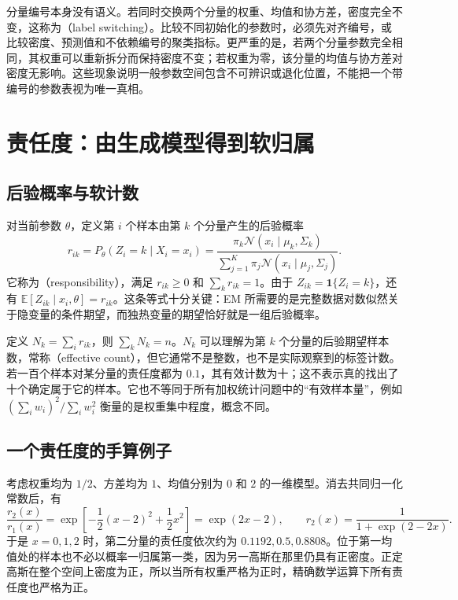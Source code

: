 \documentclass[UTF8]{ctexart}
\begin{document}
分量编号本身没有语义。若同时交换两个分量的权重、均值和协方差，密度完全不变，这称为（label switching）。比较不同初始化的参数时，必须先对齐编号，或比较密度、预测值和不依赖编号的聚类指标。更严重的是，若两个分量参数完全相同，其权重可以重新拆分而保持密度不变；若权重为零，该分量的均值与协方差对密度无影响。这些现象说明一般参数空间包含不可辨识或退化位置，不能把一个带编号的参数表视为唯一真相。

\section{责任度：由生成模型得到软归属}
\label{sec:gmm-responsibility}

\subsection{后验概率与软计数}
对当前参数 $\theta$，定义第 $i$ 个样本由第 $k$ 个分量产生的后验概率
\begin{equation}
r_{ik}=P_\theta(Z_i=k\mid X_i=x_i)
=\frac{\pi_k\mathcal N(x_i\mid\mu_k,\Sigma_k)}{\sum_{j=1}^K\pi_j\mathcal N(x_i\mid\mu_j,\Sigma_j)}.
\label{eq:gmm-responsibility}
\end{equation}
它称为（responsibility），满足 $r_{ik}\geq0$ 和 $\sum_kr_{ik}=1$。由于 $Z_{ik}=\mathbf1\{Z_i=k\}$，还有 $\mathbb E[Z_{ik}\mid x_i,\theta]=r_{ik}$。这条等式十分关键：EM 所需要的是完整数据对数似然关于隐变量的条件期望，而独热变量的期望恰好就是一组后验概率。

定义 $N_k=\sum_i r_{ik}$，则 $\sum_kN_k=n$。$N_k$ 可以理解为第 $k$ 个分量的后验期望样本数，常称（effective count），但它通常不是整数，也不是实际观察到的标签计数。若一百个样本对某分量的责任度都为 $0.1$，其有效计数为十；这不表示真的找出了十个确定属于它的样本。它也不等同于所有加权统计问题中的“有效样本量”，例如 $(\sum_iw_i)^2/\sum_iw_i^2$ 衡量的是权重集中程度，概念不同。

\subsection{一个责任度的手算例子}
考虑权重均为 $1/2$、方差均为 $1$、均值分别为 $0$ 和 $2$ 的一维模型。消去共同归一化常数后，有
\[
\frac{r_2(x)}{r_1(x)}
=\exp\!\left[-\frac12(x-2)^2+\frac12x^2\right]
=\exp(2x-2),
\qquad r_2(x)=\frac{1}{1+\exp(2-2x)}.
\]
于是 $x=0,1,2$ 时，第二分量的责任度依次约为 $0.1192,0.5,0.8808$。位于第一均值处的样本也不必以概率一归属第一类，因为另一高斯在那里仍具有正密度。正定高斯在整个空间上密度为正，所以当所有权重严格为正时，精确数学运算下所有责任度也严格为正。
\end{document}
